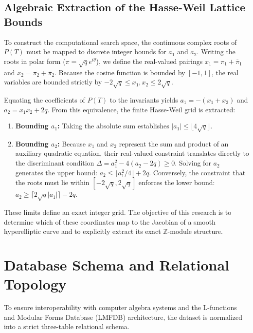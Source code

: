 \documentclass[letterpaper, 11pt]{article}
\begin{document}
	\subsection{Algebraic Extraction of the Hasse-Weil Lattice Bounds}
	To construct the computational search space, the continuous complex roots of $P(T)$ must be mapped to discrete integer bounds for $a_1$ and $a_2$. Writing the roots in polar form ($\pi = \sqrt{q}e^{i\theta}$), we define the real-valued pairings $x_1 = \pi_1 + \bar{\pi}_1$ and $x_2 = \pi_2 + \bar{\pi}_2$. Because the cosine function is bounded by $[-1, 1]$, the real variables are bounded strictly by $-2\sqrt{q} \le x_1, x_2 \le 2\sqrt{q}$. 
	
	Equating the coefficients of $P(T)$ to the invariants yields $a_1 = -(x_1 + x_2)$ and $a_2 = x_1 x_2 + 2q$. From this equivalence, the finite Hasse-Weil grid is extracted:
	\begin{enumerate}
		\item \textbf{Bounding $a_1$:} Taking the absolute sum establishes $|a_1| \le \lfloor 4\sqrt{q} \rfloor$.
		\item \textbf{Bounding $a_2$:} Because $x_1$ and $x_2$ represent the sum and product of an auxiliary quadratic equation, their real-valued constraint translates directly to the discriminant condition $\Delta = a_1^2 - 4(a_2 - 2q) \ge 0$. Solving for $a_2$ generates the upper bound: $a_2 \le \lfloor a_1^2/4 \rfloor + 2q$. Conversely, the constraint that the roots must lie within $[-2\sqrt{q}, 2\sqrt{q}]$ enforces the lower bound: $a_2 \ge \lceil 2\sqrt{q}|a_1| \rceil - 2q$.
	\end{enumerate}
	These limits define an exact integer grid. The objective of this research is to determine which of these coordinates map to the Jacobian of a smooth hyperelliptic curve and to explicitly extract its exact $\mathbb{Z}$-module structure.
	
	\section{Database Schema and Relational Topology}
	To ensure interoperability with computer algebra systems and the L-functions and Modular Forms Database (LMFDB) architecture, the dataset is normalized into a strict three-table relational schema.
	
\end{document}
